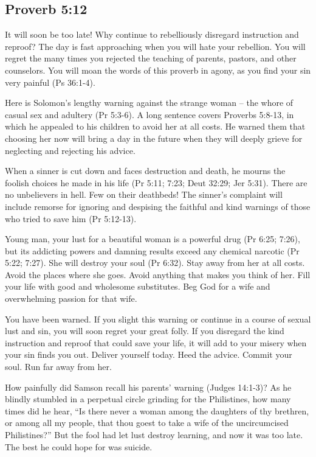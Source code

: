 \subsection{Proverb 5:12}
It will soon be too late! Why continue to rebelliously disregard instruction and reproof? The day is fast approaching when you will hate your rebellion. You will regret the many times you rejected the teaching of parents, pastors, and other counselors. You will moan the words of this proverb in agony, as you find your sin very painful (Ps 36:1-4).

Here is Solomon’s lengthy warning against the strange woman – the whore of casual sex and adultery (Pr 5:3-6). A long sentence covers Proverbs 5:8-13, in which he appealed to his children to avoid her at all costs. He warned them that choosing her now will bring a day in the future when they will deeply grieve for neglecting and rejecting his advice.

When a sinner is cut down and faces destruction and death, he mourns the foolish choices he made in his life (Pr 5:11; 7:23; Deut 32:29; Jer 5:31). There are no unbelievers in hell. Few on their deathbeds! The sinner’s complaint will include remorse for ignoring and despising the faithful and kind warnings of those who tried to save him (Pr 5:12-13).

Young man, your lust for a beautiful woman is a powerful drug (Pr 6:25; 7:26), but its addicting powers and damning results exceed any chemical narcotic (Pr 5:22; 7:27). She will destroy your soul (Pr 6:32). Stay away from her at all costs. Avoid the places where she goes. Avoid anything that makes you think of her. Fill your life with good and wholesome substitutes. Beg God for a wife and overwhelming passion for that wife.

You have been warned. If you slight this warning or continue in a course of sexual lust and sin, you will soon regret your great folly. If you disregard the kind instruction and reproof that could save your life, it will add to your misery when your sin finds you out. Deliver yourself today. Heed the advice. Commit your soul. Run far away from her.

How painfully did Samson recall his parents’ warning (Judges 14:1-3)? As he blindly stumbled in a perpetual circle grinding for the Philistines, how many times did he hear, “Is there never a woman among the daughters of thy brethren, or among all my people, that thou goest to take a wife of the uncircumcised Philistines?” But the fool had let lust destroy learning, and now it was too late. The best he could hope for was suicide.

